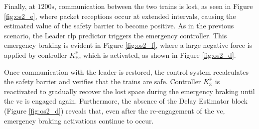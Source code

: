 	Finally, at $1200\unit{\second}$, communication between the two trains is lost, as seen in Figure \ref{fig:os2_e}, where packet receptions occur at extended intervals, causing the estimated value of the safety barrier to become positive. As in the previous scenario, the Leader \gls{rlp} predictor triggers the emergency controller. This emergency braking is evident in Figure \ref{fig:os2_f}, where a large negative force is applied by controller $K_{\mathrm{E}}^\mathrm{F}$, which is activated, as shown in Figure \ref{fig:os2_d}.
	
	Once communication with the leader is restored, the control system recalculates the safety barrier and verifies that the trains are safe. Controller $K_3^\mathrm{F}$ is reactivated to gradually recover the lost space during the emergency braking until the \gls{vc} is engaged again. Furthermore, the absence of the Delay Estimator block (Figure \ref{fig:os2_d}) reveals that, even after the re-engagement of the \gls{vc}, emergency braking activations continue to occur.
	
	
	
